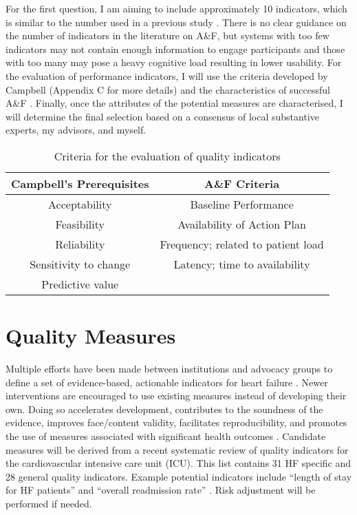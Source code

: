 For the first question, I am aiming to include approximately 10 indicators, which is similar to the number used in a previous study \cite{matthews2007impact}. There is no clear guidance on the number of indicators in the literature on A\&F, but systems with too few indicators may not contain enough information to engage participants and those with too many may pose a heavy cognitive load resulting in lower usability. For the evaluation of performance indicators, I will use the criteria developed by Campbell (Appendix C for more details)  \cite{campbell2002research} and the characteristics of successful A\&F \cite{ivers2012audit}. Finally, once the attributes of the potential measures are characterised, I will determine the final selection based on a consensus of local substantive experts, my advisors, and myself.

\begin{table}[h!]
\centering
\vspace{-2mm}
\begin{tabular}{c|c}
     \textbf{Campbell's Prerequisites} & \textbf{A\&F Criteria}  \\ 
     \hline
     Acceptability         & Baseline Performance  \\  
     Feasibility           & Availability of Action Plan \\
     Reliability           & Frequency; related to patient load \\
     Sensitivity to change & Latency; time to availability \\
     Predictive value   &  \\
\end{tabular}
\caption{Criteria for the evaluation of quality indicators}
\vspace{-5mm}
\end{table}

\section{Quality Measures}
Multiple efforts have been made between institutions and advocacy groups to define a set of evidence-based, actionable indicators for heart failure \cite{hong2006overview, fonarow2010improving, kelley2006health}. Newer interventions are encouraged to use existing measures instead of developing their own. Doing so accelerates development, contributes to the soundness of the evidence, improves face/content validity, facilitates reproducibility, and promotes the use of measures associated with significant health outcomes \cite{smith2009performance}. 
Candidate measures will be derived from a recent systematic review of quality indicators for the cardiovascular intensive care unit (\gls{ICU}). This list contains 31 \gls{HF} specific and 28 general quality indicators. Example potential indicators include ``length of stay for HF patients'' and ``overall readmission rate'' \cite{goldfarb2018systematic}. Risk adjustment will be performed if needed.

